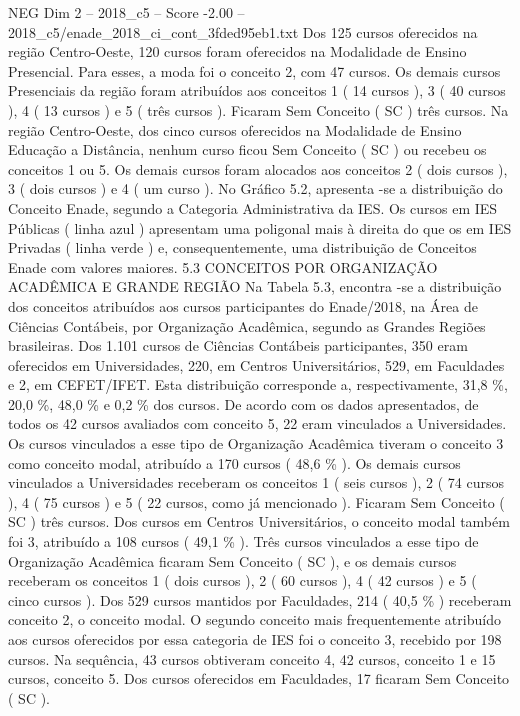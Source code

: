 \begin{textsample}{NEG Dim 2 – 2018\_c5 – Score -2.00 – 2018\_c5/enade\_2018\_ci\_cont\_3fded95eb1.txt}
Dos 125 cursos oferecidos na região Centro-Oeste, 120 cursos foram oferecidos na Modalidade de Ensino Presencial.
Para esses, a moda foi o conceito 2, com 47 cursos.
Os demais cursos Presenciais da região foram atribuídos aos conceitos 1 ( 14 cursos ), 3 ( 40 cursos ), 4 ( 13 cursos ) e 5 ( três cursos ).
Ficaram Sem Conceito ( SC ) três cursos.
Na região Centro-Oeste, dos cinco cursos oferecidos na Modalidade de Ensino Educação a Distância, nenhum curso ficou Sem Conceito ( SC ) ou recebeu os conceitos 1 ou 5.
Os demais cursos foram alocados aos conceitos 2 ( dois cursos ), 3 ( dois cursos ) e 4 ( um curso ).
No Gráfico 5.2, apresenta -se a distribuição do Conceito Enade, segundo a Categoria Administrativa da IES.
Os cursos em IES Públicas ( linha azul ) apresentam uma poligonal mais à direita do que os em IES Privadas ( linha verde ) e, consequentemente, uma distribuição de Conceitos Enade com valores maiores. 5.3 CONCEITOS POR ORGANIZAÇÃO ACADÊMICA E GRANDE REGIÃO Na Tabela 5.3, encontra -se a distribuição dos conceitos atribuídos aos cursos participantes do Enade/2018, na Área de Ciências Contábeis, por Organização Acadêmica, segundo as Grandes Regiões brasileiras.
Dos 1.101 cursos de Ciências Contábeis participantes, 350 eram oferecidos em Universidades, 220, em Centros Universitários, 529, em Faculdades e 2, em CEFET/IFET.
Esta distribuição corresponde a, respectivamente, 31,8 \%, 20,0 \%, 48,0 \% e 0,2 \% dos cursos.
De acordo com os dados apresentados, de todos os 42 cursos avaliados com conceito 5, 22 eram vinculados a Universidades.
Os cursos vinculados a esse tipo de Organização Acadêmica tiveram o conceito 3 como conceito modal, atribuído a 170 cursos ( 48,6 \% ).
Os demais cursos vinculados a Universidades receberam os conceitos 1 ( seis cursos ), 2 ( 74 cursos ), 4 ( 75 cursos ) e 5 ( 22 cursos, como já mencionado ).
Ficaram Sem Conceito ( SC ) três cursos.
Dos cursos em Centros Universitários, o conceito modal também foi 3, atribuído a 108 cursos ( 49,1 \% ).
Três cursos vinculados a esse tipo de Organização Acadêmica ficaram Sem Conceito ( SC ), e os demais cursos receberam os conceitos 1 ( dois cursos ), 2 ( 60 cursos ), 4 ( 42 cursos ) e 5 ( cinco cursos ).
Dos 529 cursos mantidos por Faculdades, 214 ( 40,5 \% ) receberam conceito 2, o conceito modal.
O segundo conceito mais frequentemente atribuído aos cursos oferecidos por essa categoria de IES foi o conceito 3, recebido por 198 cursos.
Na sequência, 43 cursos obtiveram conceito 4, 42 cursos, conceito 1 e 15 cursos, conceito 5.
Dos cursos oferecidos em Faculdades, 17 ficaram Sem Conceito ( SC ).

\end{textsample}
